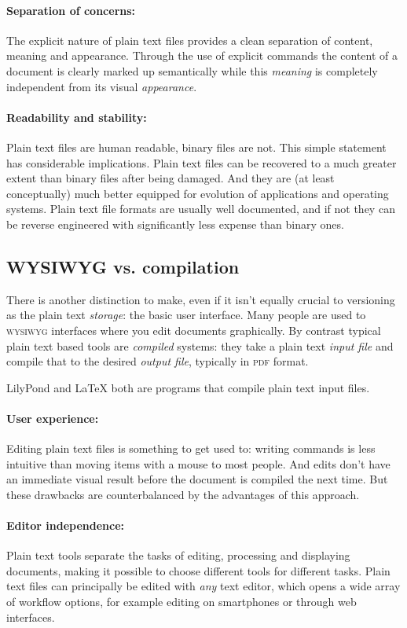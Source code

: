 \documentclass[11pt,a4paper]{article}
\begin{document}
\paragraph{Separation of concerns:}
The explicit nature of plain text files provides a clean separation of content, meaning
and appearance. Through the use of explicit commands the content
of a document is clearly marked up semantically while this \emph{meaning} is completely
independent from its visual \emph{appearance}.

\paragraph{Readability and stability:}
Plain text files are human readable, binary files are not. This simple statement has
considerable implications. Plain text files can be recovered to a much greater extent
than binary files after being damaged. And they are (at least conceptually) much better
equipped for evolution of applications and operating systems. Plain text file formats are
usually well documented, and if not they can be reverse engineered with significantly
less expense than binary ones.

\subsection{WYSIWYG vs. compilation}
There is another distinction to make, even if it isn't equally crucial to versioning
as the plain text \emph{storage}: the basic user interface. Many people are used to
\textsc{wysiwyg} interfaces where you edit documents graphically. By contrast typical
plain text based tools are \emph{compiled} systems: they take a plain text \emph{input
file} and compile that to the desired \emph{output file}, typically in
\textsc{pdf} format.

LilyPond and \LaTeX{} both are programs that compile plain text input files.

\paragraph{User experience:}
Editing plain text files is something to get used to: writing commands is less intuitive
than moving items with a mouse to most people. And edits don't have an immediate visual
result before the document is compiled the next time. But these drawbacks are counterbalanced
by the advantages of this approach.

\paragraph{Editor independence:}
Plain text tools separate the tasks of editing, processing and displaying documents,
making it possible to choose different tools for different tasks. Plain text files
can principally be edited with \emph{any} text editor, which opens a wide array of
workflow options, for example editing on smartphones or through web interfaces.
\end{document}
